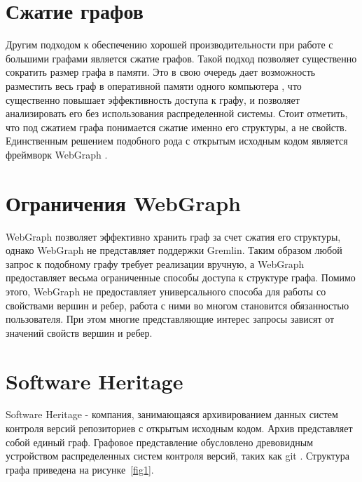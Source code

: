 \documentclass[times,specification,annotation]{itmo-student-thesis}
\begin{document}
\section{Сжатие графов}

Другим подходом к обеспечению хорошей производительности при работе с большими графами является сжатие графов. Такой подход позволяет существенно сократить размер графа в памяти. Это в свою очередь дает возможность разместить весь граф в оперативной памяти одного компьютера \cite{saner}, что существенно повышает эффективность доступа к графу, и позволяет анализировать его без использования распределенной системы. Стоит отметить, что под сжатием графа понимается сжатие именно его структуры, а не свойств. Единственным решением подобного рода с открытым исходным кодом является фреймворк WebGraph \cite{webgraph}.

\section{Ограничения WebGraph}

WebGraph позволяет эффективно хранить граф за счет сжатия его структуры, однако WebGraph не представляет поддержки Gremlin. Таким образом любой запрос к подобному графу требует реализации вручную, а WebGraph предоставляет весьма ограниченные способы доступа к структуре графа.
Помимо этого, WebGraph не предоставляет универсального способа для работы со свойствами вершин и ребер, работа с ними во многом становится обязанностью пользователя. При этом многие представляющие интерес запросы зависят от значений свойств вершин и ребер.

\section{Software Heritage}

Software Heritage - компания, занимающаяся архивированием данных систем контроля версий репозиториев с открытым исходным кодом. Архив представляет собой единый граф. Графовое представление обусловлено древовидным устройством распределенных систем контроля версий, таких как git \cite{git}. Структура графа приведена на рисунке~\ref{fig1}.
\end{document}

